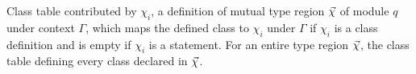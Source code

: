 Class table contributed by $\chi_i$, a definition of mutual type region $\seq{\chi}$ of module $q$ under context
$\Gamma$, which maps the defined class to $\chi_i$ under $\Gamma$ if $\chi_i$ is a class definition and is empty if $\chi_i$ is a
 statement. For an entire type region $\seq{\chi}$, the class table defining every class declared in
$\seq{\chi}$.
